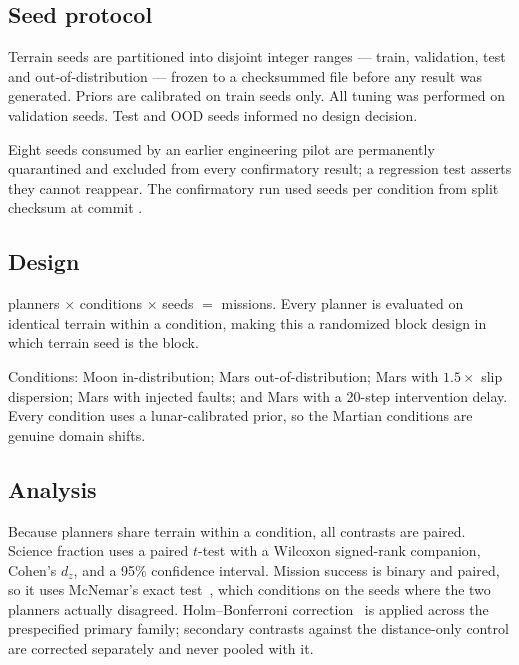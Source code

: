 \documentclass[11pt]{article}
\begin{document}
\subsection{Seed protocol}

Terrain seeds are partitioned into disjoint integer ranges --- train,
validation, test and out-of-distribution --- frozen to a checksummed file
before any result was generated. Priors are calibrated on train seeds only.
All tuning was performed on validation seeds. Test and OOD seeds informed no
design decision.

Eight seeds consumed by an earlier engineering pilot are permanently
quarantined and excluded from every confirmatory result; a regression test
asserts they cannot reappear. The confirmatory run used
\MainSeedsPerCondition{} seeds per condition from split checksum
\texttt{\MainSplitChecksum} at commit \texttt{\MainCommit}.

\subsection{Design}

\MainPlanners{} planners $\times$ \MainConditions{} conditions $\times$
\MainSeedsPerCondition{} seeds $=$ \MainMissions{} missions. Every planner is
evaluated on identical terrain within a condition, making this a randomized
block design in which terrain seed is the block.

Conditions: Moon in-distribution; Mars out-of-distribution; Mars with
$1.5\times$ slip dispersion; Mars with injected faults; and Mars with a
20-step intervention delay. Every condition uses a lunar-calibrated prior, so
the Martian conditions are genuine domain shifts.

\subsection{Analysis}

Because planners share terrain within a condition, all contrasts are paired.
Science fraction uses a paired $t$-test with a Wilcoxon signed-rank companion,
Cohen's $d_z$, and a 95\% confidence interval. Mission success is binary and
paired, so it uses McNemar's exact test~\cite{mcnemar1947}, which conditions on the
seeds where the two planners actually disagreed. Holm--Bonferroni correction~\cite{holm1979} is applied
across the prespecified primary family; secondary contrasts against the
distance-only control are corrected separately and never pooled with it.
\end{document}
